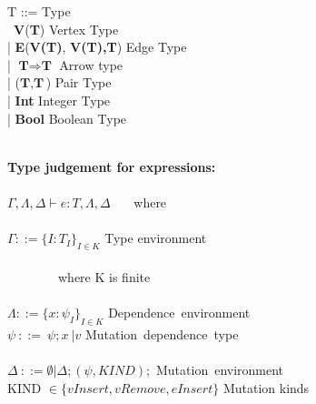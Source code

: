 \begin{frame}
  \begin{tiny}
  \begin{roman-grammar}
  
  
  T ::= \>\>\>\>\> Type \\
    \ttab \ \textbf{V}(\textbf{T}) \>\>\>\>\> Vertex Type \\
    \ttab | \textbf{E}(\textbf{V(T)}, \textbf{V(T),}\textbf{T}) \>\>\>\>\> Edge Type\\
    \ttab | $\textbf{T} \Rightarrow \textbf{T}$ \>\>\>\>\> Arrow type \\
    \ttab | ($\textbf{T}, \textbf{T}$) \>\>\>\>\> Pair Type \\
    \ttab | \textbf{Int} \>\>\>\>\> Integer Type \\
    \ttab | \textbf{Bool} \>\>\>\>\> Boolean Type\\ 
\ \\
\newline
\newline

  \textbf{Type judgement for expressions:}
  \\ \ \\
  $\Gamma, \Lambda, \Delta \vdash e : T, \Lambda, \Delta$ \ \ \  where \\ \ \\
  $\Gamma ::= {\{ I : T_I \}}_{I \in K}$ \>\>\>\> Type environment\\ \ \\
  \ \ \ \ \ \ \ \ where K is finite \\
  \ \\ $\Lambda ::= {\{ x: \psi_I \}}_{I \in K}$  \>\>\>\> Dependence\ environment
  \ \\ $\psi \ ::= \ \psi ;x\ | v$ \>\>\>\> Mutation\ dependence\ type\\
  \ \\ $\Delta \ ::= \emptyset | \Delta; (\psi, KIND);$ \>\>\>\> Mutation\ environment\\
  KIND $\in \{vInsert, vRemove, eInsert\}$ \>\>\>\>  Mutation kinds 

\end{roman-grammar}
\end{tiny}  
\end{frame}